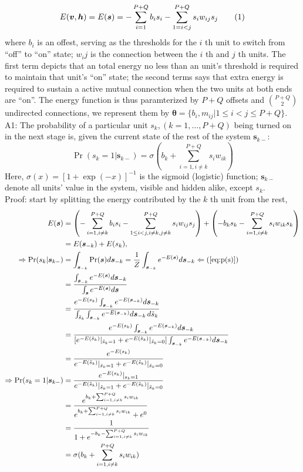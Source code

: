 \documentclass[11pt]{article}
\newcommand\numberthis{\addtocounter{equation}{1}\tag{\theequation}}
\newcommand{\vh}{\boldsymbol{h}}
\newcommand{\vv}{\boldsymbol{v}}
\newcommand{\vs}{\boldsymbol{s}}
\newcommand{\pEC}{\boldsymbol{\theta}}
\begin{document}
\begin{align*}\label{eq:e(s)} %
    E(\vv, \vh) = E(\vs) = -\sum_{i=1}^{P+Q} b_i s_i - \sum_{1 = i < j}^{P+Q} s_i w_{ij} s_j \numberthis
\end{align*}
where $b_i$ is an offest, serving as the thresholds for the $i$ th unit to switch from ``off'' to ``on'' state; $w_ij$ is the connection between the $i$ th and $j$ th units. The first term depicts that an total energy no less than an unit's threshold is required to maintain that unit's ``on'' state; the second terms says that extra energy is required to sustain a active mutual connection when the two units at both ends are ``on''. The energy function is thus paramterized by $P+Q$ offsets and $P+Q \choose 2$ undirected connections, we represent them by $\pEC = \{b_i, m_{ij} | 1 \le i < j \le P+Q\}$. \\
A1: The probability of a particular unit $s_k, (k = 1, \dots, P+Q)$ being turned on in the next stage is, given the current state of the rest of the system $\vs_{k-}$:
\begin{equation}\label{eq:p(s_k=1)}
  \Pr(s_k = 1|\vs_{k-}) = \sigma(b_k + \sum_{i=1, i \ne k}^{P+Q}{s_i w_{ik}})
\end{equation}
Here,  $\sigma(x) = [1 + \exp({-x})]^{-1}$ is the sigmoid (logistic) function; $\vs_{k-}$ denote all units' value in the system, visible and hidden alike, except $s_k$. \\
Proof: start by splitting the energy contributed by the $k$ th unit from the rest,
\newcommand{\st}{\tilde{s}}
\begin{align*}
  E(\vs)
  & = \left( -\sum_{i=1, i \ne k}^{P+Q} b_i s_i - \sum_{1 \le i < j, i \ne k, j \ne k}^{P+Q} s_i w_{ij} s_j \right) + \left(-b_k s_k - \sum_{i=1, i \ne k}^{P+Q}s_i w_{ik} s_k \right) \\
  & = E(\vs_{-k}) + E(s_k), \\
  \Rightarrow \Pr(s_k | \vs_{k-})
  & = \int_{\vs_{-k}} \Pr(\vs) d\vs_{-k} = \frac{1}{Z} \int_{\vs_{-k}} e^{-E(\vs)} d\vs_{-k} \Leftarrow (\ref{eq:p(s)}) \\
  & = \frac{\int_{\vs_{-k}} e^{-E(\vs)} d\vs_{-k}}{\int_{\vs} e^{-E(\vs)} d\vs} \\
  & = \frac{e^{-E(s_k)} \int_{\vs_{-k}} e^{-E(\vs_{-k})} d\vs_{-k}}  {\int_{\st_k} \int_{\vs_{-k}} e^{-E(\vs_{-k})} d\vs_{-k}\,d\st_k} \\
  & = \frac{e^{-E(s_k)} \int_{\vs_{-k}} e^{-E(\vs_{-k})} d\vs_{-k}}  {[e^{-E(\st_k)}|_{\st_k=1} + e^{-E(\st_k)}|_{\st_k=0}] \int_{\vs_{-k}} e^{-E(\vs_{-k})} d\vs_{-k}} \\
  & = \frac{e^{-E(s_k)}}{e^{-E(\st_k)}|_{\st_k=1} + e^{-E(\st_k)}|_{\st_k=0}} \\
  \Rightarrow \Pr(s_k=1 | \vs_{k-})
  & = \frac{e^{-E(s_k)}|_{s_k=1}}{e^{-E(\st_k)}|_{\st_k=1} + e^{-E(\st_k)}|_{\st_k=0}} \\
  & = \frac{e^{b_k + \sum_{i=1, i \ne k}^{P+Q}{s_i w_{ik}}}}{e^{b_k + \sum_{i=1, i \ne k}^{P+Q}{s_i w_{ik}}} + e^{0}} \\
  & = \frac{1}{1 + e^{-b_k - \sum_{i=1, i \ne k}^{P+Q}{s_i w_{ik}}}} \\
  & = \sigma(b_k + \sum_{i=1, i \ne k}^{P+Q}{s_i w_{ik}})
\end{align*}
\end{document}
